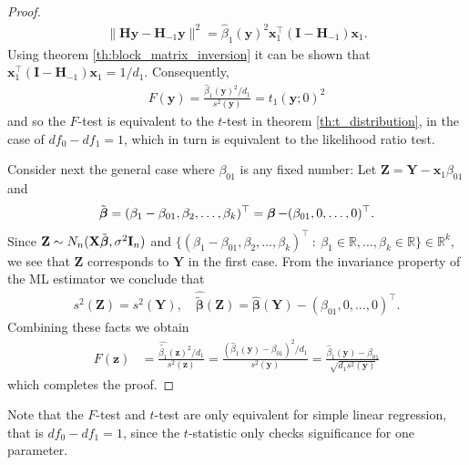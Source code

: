 \begin{proof}
    \begin{align*}
        \|\textbf{H}\textbf{y} - \textbf{H}_{-1}\textbf{y}\|^2 = \hat{\beta}_1(\textbf{y})^2\textbf{x}_1^\top(\textbf{I} - \textbf{H}_{-1})\textbf{x}_1.
    \end{align*}
    Using theorem \ref{th:block_matrix_inversion} it can be shown that $\textbf{x}_1^\top(\textbf{I} - \textbf{H}_{-1})\textbf{x}_1 = 1/d_1$.
    Consequently,
    \begin{align*}
         F(\textbf{y}) = \frac{\hat{\beta}_1(\textbf{y})^2/d_1}{s^2(\textbf{y})} =  t_1(\textbf{y};0)^2
    \end{align*}
    and so the $F$-test is equivalent to the $t$-test in theorem \ref{th:t_distribution}, in the case of $df_0 - df_1=1$, which in turn is equivalent to the likelihood ratio test.
    
    Consider next the general case where $\beta_{01}$ is any fixed number: Let $\textbf{Z} = \textbf{Y} - \textbf{x}_1\beta_{01}$ and
    \begin{align*}
        \Tilde{\operatorname{\boldsymbol{\beta}}} = (\beta_1 - \beta_{01}, \beta_2, \ldots, \beta_k)^\top = \operatorname{\boldsymbol{\beta}} - (\beta_{01}, 0, \ldots, 0)^\top.
    \end{align*}
    Since $\textbf{Z} \sim N_n(\textbf{X}\Tilde{\boldsymbol{\beta}}, \sigma^2\textbf{I}_n)$ and $\{ (\beta_1 - \beta_{01}, \beta_2, \ldots, \beta_k)^\top \: : \: \beta_1 \in \mathbb{R}, \ldots, \beta_k \in \mathbb{R} \} \in \mathbb{R}^k$, we see that $\textbf{Z}$ corresponds to $\textbf{Y}$ in the first case.
    From the invariance property of the ML estimator we conclude that
    \begin{align*}
        s^2(\textbf{Z}) = s^2(\textbf{Y}), \quad \hat{\tilde{\boldsymbol{\beta}}}(\textbf{Z}) = \hat{\boldsymbol{\beta}}(\textbf{Y}) - (\beta_{01}, 0, \ldots, 0)^\top.
    \end{align*}
    Combining these facts we obtain
    \begin{align*}
        F(\textbf{z}) &=
        \frac{\hat{\tilde{\beta_1}}(\textbf{z})^2/d_1}{s^2(\textbf{z})} = 
        \frac{(\hat{\beta}_1(\textbf{y}) - \beta_{01})^2/d_1}{s^2(\textbf{y})} =
         \frac{\hat{\beta}_1(\textbf{y}) - \beta_{01}}{\sqrt{d_1s^2(\textbf{y})}}
    \end{align*}
    which completes the proof.
\end{proof}

Note that the $F$-test and $t$-test are only equivalent for simple linear regression, that is $df_0 - df_1 = 1$, since the $t$-statistic only checks significance for one parameter.

